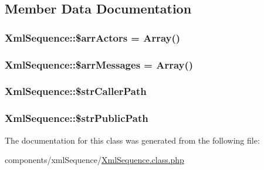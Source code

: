 \subsection{Member Data Documentation}
\hypertarget{class_xml_sequence_32c07693b6fb096943d6594bc198840d}{
\subsubsection[{\$arrActors}]{\setlength{\rightskip}{0pt plus 5cm}XmlSequence::\$arrActors = Array()}}
\label{class_xml_sequence_32c07693b6fb096943d6594bc198840d}


\hypertarget{class_xml_sequence_49575b42830f5ce6152e1cc4e2d934f3}{
\subsubsection[{\$arrMessages}]{\setlength{\rightskip}{0pt plus 5cm}XmlSequence::\$arrMessages = Array()}}
\label{class_xml_sequence_49575b42830f5ce6152e1cc4e2d934f3}


\hypertarget{class_xml_sequence_81ff70d1bae4303f0454e8f76897cde7}{
\subsubsection[{\$strCallerPath}]{\setlength{\rightskip}{0pt plus 5cm}XmlSequence::\$strCallerPath}}
\label{class_xml_sequence_81ff70d1bae4303f0454e8f76897cde7}


\hypertarget{class_xml_sequence_5a3049f005498d02e15be8e67c759ea1}{
\subsubsection[{\$strPublicPath}]{\setlength{\rightskip}{0pt plus 5cm}XmlSequence::\$strPublicPath}}
\label{class_xml_sequence_5a3049f005498d02e15be8e67c759ea1}




The documentation for this class was generated from the following file:\begin{CompactItemize}
\item 
components/xmlSequence/\hyperlink{_xml_sequence_8class_8php}{XmlSequence.class.php}\end{CompactItemize}
